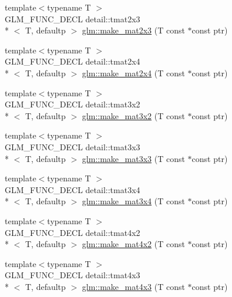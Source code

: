 \begin{DoxyCompactItemize}
\item 
{\footnotesize template$<$typename T $>$ }\\G\-L\-M\-\_\-\-F\-U\-N\-C\-\_\-\-D\-E\-C\-L detail\-::tmat2x3\\*
$<$ T, defaultp $>$ \hyperlink{group__gtc__type__ptr_gadef48cd950566f23a4b1e47127ee478c}{glm\-::make\-\_\-mat2x3} (T const $\ast$const ptr)
\item 
{\footnotesize template$<$typename T $>$ }\\G\-L\-M\-\_\-\-F\-U\-N\-C\-\_\-\-D\-E\-C\-L detail\-::tmat2x4\\*
$<$ T, defaultp $>$ \hyperlink{group__gtc__type__ptr_ga174a43e8913682834de9cd918e36df25}{glm\-::make\-\_\-mat2x4} (T const $\ast$const ptr)
\item 
{\footnotesize template$<$typename T $>$ }\\G\-L\-M\-\_\-\-F\-U\-N\-C\-\_\-\-D\-E\-C\-L detail\-::tmat3x2\\*
$<$ T, defaultp $>$ \hyperlink{group__gtc__type__ptr_gaa40868af4de8c5ed5470fdcc9985dbfc}{glm\-::make\-\_\-mat3x2} (T const $\ast$const ptr)
\item 
{\footnotesize template$<$typename T $>$ }\\G\-L\-M\-\_\-\-F\-U\-N\-C\-\_\-\-D\-E\-C\-L detail\-::tmat3x3\\*
$<$ T, defaultp $>$ \hyperlink{group__gtc__type__ptr_gaf8ba0a0a523423ae1149a1c2d90eb337}{glm\-::make\-\_\-mat3x3} (T const $\ast$const ptr)
\item 
{\footnotesize template$<$typename T $>$ }\\G\-L\-M\-\_\-\-F\-U\-N\-C\-\_\-\-D\-E\-C\-L detail\-::tmat3x4\\*
$<$ T, defaultp $>$ \hyperlink{group__gtc__type__ptr_gaa0c07ac459a5e16374aa12e3b35ee043}{glm\-::make\-\_\-mat3x4} (T const $\ast$const ptr)
\item 
{\footnotesize template$<$typename T $>$ }\\G\-L\-M\-\_\-\-F\-U\-N\-C\-\_\-\-D\-E\-C\-L detail\-::tmat4x2\\*
$<$ T, defaultp $>$ \hyperlink{group__gtc__type__ptr_gae4ad99adfe4fb195a192712a71de901d}{glm\-::make\-\_\-mat4x2} (T const $\ast$const ptr)
\item 
{\footnotesize template$<$typename T $>$ }\\G\-L\-M\-\_\-\-F\-U\-N\-C\-\_\-\-D\-E\-C\-L detail\-::tmat4x3\\*
$<$ T, defaultp $>$ \hyperlink{group__gtc__type__ptr_ga37ec66362c22d86ad2ee11930b638c4a}{glm\-::make\-\_\-mat4x3} (T const $\ast$const ptr)

\end{DoxyCompactItemize}
